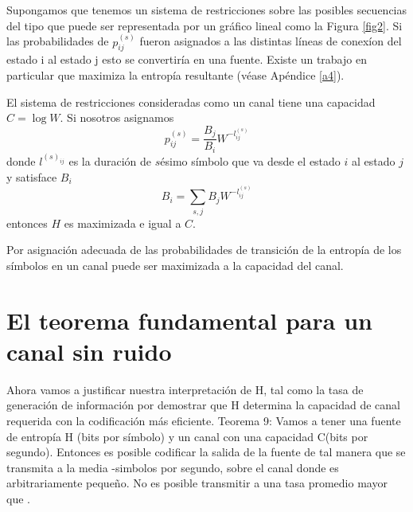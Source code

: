 Supongamos que tenemos un sistema de restricciones sobre las posibles
secuencias del tipo que puede ser representada por un gr\'afico lineal
como la Figura \ref{fig2}. Si las probabilidades de $p^{(s)}_{ij}$
fueron asignados a las distintas l\'ineas de conex\'ion del estado i
al estado j esto se convertir\'ia en una fuente.  Existe un trabajo en
particular que maximiza la entrop\'ia resultante (v\'ease Ap\'endice
\ref{a4}).

\begin{theorem}
El sistema de restricciones consideradas como un canal tiene una
capacidad $C=\log W$.  Si nosotros asignamos
\begin{equation}
p^{(s)}_{ij}=\frac{B_{j}}{B_{i}}W^{-l^{(s)}_{ij}}
\end{equation}
donde $l^{(s)_{ij}}$ es la duraci\'on de $s$\'{e}simo s\'imbolo que va
desde el estado $i$ al estado $j$ y satisface $B_{i}$
\begin{equation}
B_{i}=\sum_{s,j} B_{j}W^{-l^{(s)}_{ij}}
\end{equation}
entonces $H$ es maximizada e igual a $C$.
\end{theorem}

Por asignaci\'on adecuada de las probabilidades de transici\'on de la
entrop\'ia de los s\'imbolos en un canal puede ser maximizada a la
capacidad del canal.

\section{El teorema fundamental para un canal sin ruido}

Ahora vamos a justificar nuestra interpretaci\'on de H, tal como la tasa de generaci\'on de informaci\'on por 
demostrar que H determina la capacidad de canal requerida con la codificaci\'on m\'as eficiente.
Teorema 9: Vamos a tener una fuente de entrop\'ia H (bits por s\'imbolo) y un canal con una capacidad C(bits por 
segundo). Entonces es posible codificar la salida de la fuente de tal manera que se transmita a la media 
-\epsilon simbolos por segundo, sobre el canal donde es arbitrariamente peque\~{n}o. No es posible 
transmitir a una tasa promedio mayor que .\\


